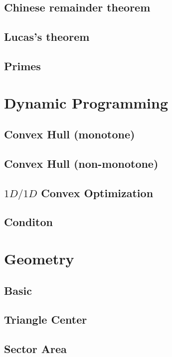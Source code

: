 \documentclass[a4paper,10pt,twocolumn,oneside]{article}
\begin{document}
\subsection{Chinese remainder theorem}

\subsection{Lucas's theorem}

\subsection{Primes}

\section{Dynamic Programming}
\subsection{Convex Hull (monotone)}

\subsection{Convex Hull (non-monotone)}

\subsection{$1D/1D$ Convex Optimization}

\subsection{Conditon}

\section{Geometry}
\subsection{Basic}

\subsection{Triangle Center}

\subsection{Sector Area}

\end{document}
